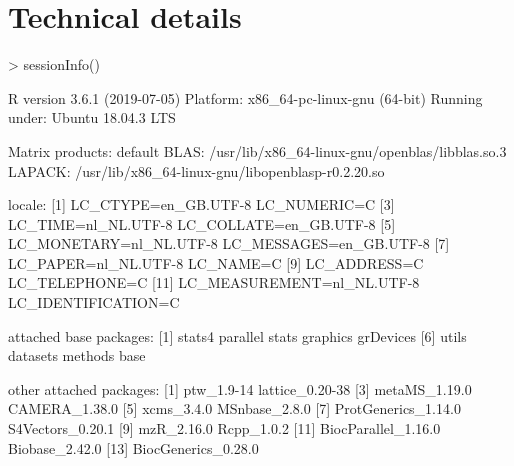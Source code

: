 \documentclass[a4paper,11pt]{article}
\begin{document}
\section{Technical details}
\begin{Schunk}
\begin{Sinput}
> sessionInfo()
\end{Sinput}
\begin{Soutput}
R version 3.6.1 (2019-07-05)
Platform: x86_64-pc-linux-gnu (64-bit)
Running under: Ubuntu 18.04.3 LTS

Matrix products: default
BLAS:   /usr/lib/x86_64-linux-gnu/openblas/libblas.so.3
LAPACK: /usr/lib/x86_64-linux-gnu/libopenblasp-r0.2.20.so

locale:
 [1] LC_CTYPE=en_GB.UTF-8       LC_NUMERIC=C              
 [3] LC_TIME=nl_NL.UTF-8        LC_COLLATE=en_GB.UTF-8    
 [5] LC_MONETARY=nl_NL.UTF-8    LC_MESSAGES=en_GB.UTF-8   
 [7] LC_PAPER=nl_NL.UTF-8       LC_NAME=C                 
 [9] LC_ADDRESS=C               LC_TELEPHONE=C            
[11] LC_MEASUREMENT=nl_NL.UTF-8 LC_IDENTIFICATION=C       

attached base packages:
[1] stats4    parallel  stats     graphics  grDevices
[6] utils     datasets  methods   base     

other attached packages:
 [1] ptw_1.9-14          lattice_0.20-38    
 [3] metaMS_1.19.0       CAMERA_1.38.0      
 [5] xcms_3.4.0          MSnbase_2.8.0      
 [7] ProtGenerics_1.14.0 S4Vectors_0.20.1   
 [9] mzR_2.16.0          Rcpp_1.0.2         
[11] BiocParallel_1.16.0 Biobase_2.42.0     
[13] BiocGenerics_0.28.0


\end{Soutput}
\end{Schunk}
\end{document}
